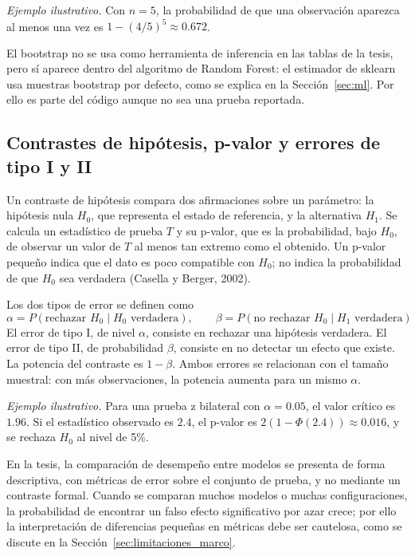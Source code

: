 \textit{Ejemplo ilustrativo.} Con $n=5$, la probabilidad de que una observación aparezca al menos una vez es $1-(4/5)^5\approx 0.672$.

El bootstrap no se usa como herramienta de inferencia en las tablas de la tesis, pero sí aparece dentro del algoritmo de Random Forest: el estimador de sklearn usa muestras bootstrap por defecto, como se explica en la Sección~\ref{sec:ml}. Por ello es parte del código aunque no sea una prueba reportada.

\subsection{Contrastes de hipótesis, p-valor y errores de tipo I y II}
Un contraste de hipótesis compara dos afirmaciones sobre un parámetro: la hipótesis nula $H_0$, que representa el estado de referencia, y la alternativa $H_1$. Se calcula un estadístico de prueba $T$ y su p-valor, que es la probabilidad, bajo $H_0$, de observar un valor de $T$ al menos tan extremo como el obtenido. Un p-valor pequeño indica que el dato es poco compatible con $H_0$; no indica la probabilidad de que $H_0$ sea verdadera (Casella y Berger, 2002).

Los dos tipos de error se definen como
\begin{equation}
\alpha=P(\text{rechazar } H_0 \mid H_0 \text{ verdadera}), \qquad \beta=P(\text{no rechazar } H_0 \mid H_1 \text{ verdadera})
\label{eq:errores_tipo}
\end{equation}
El error de tipo I, de nivel $\alpha$, consiste en rechazar una hipótesis verdadera. El error de tipo II, de probabilidad $\beta$, consiste en no detectar un efecto que existe. La potencia del contraste es $1-\beta$. Ambos errores se relacionan con el tamaño muestral: con más observaciones, la potencia aumenta para un mismo $\alpha$.

\textit{Ejemplo ilustrativo.} Para una prueba z bilateral con $\alpha=0.05$, el valor crítico es $1.96$. Si el estadístico observado es $2.4$, el p-valor es $2(1-\Phi(2.4))\approx 0.016$, y se rechaza $H_0$ al nivel de 5\%.

En la tesis, la comparación de desempeño entre modelos se presenta de forma descriptiva, con métricas de error sobre el conjunto de prueba, y no mediante un contraste formal. Cuando se comparan muchos modelos o muchas configuraciones, la probabilidad de encontrar un falso efecto significativo por azar crece; por ello la interpretación de diferencias pequeñas en métricas debe ser cautelosa, como se discute en la Sección~\ref{sec:limitaciones_marco}.

